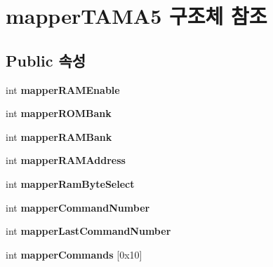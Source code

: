 \hypertarget{structmapper_t_a_m_a5}{}\section{mapper\+T\+A\+M\+A5 구조체 참조}
\label{structmapper_t_a_m_a5}
\subsection*{Public 속성}
\begin{DoxyCompactItemize}
\item 
\mbox{\label{structmapper_t_a_m_a5_aac7b2e1f7346e4db54bdb3158b1faf96}} 
int {\bfseries mapper\+R\+A\+M\+Enable}
\item 
\mbox{\label{structmapper_t_a_m_a5_a29746447b0317e41dc6b23031c02ae97}} 
int {\bfseries mapper\+R\+O\+M\+Bank}
\item 
\mbox{\label{structmapper_t_a_m_a5_a13e94f27b6428ce1c120ca95eff610ab}} 
int {\bfseries mapper\+R\+A\+M\+Bank}
\item 
\mbox{\label{structmapper_t_a_m_a5_a35ce9e6605c0506391bd92b2a8b0bb9c}} 
int {\bfseries mapper\+R\+A\+M\+Address}
\item 
\mbox{\label{structmapper_t_a_m_a5_afbb084b777ea7e13fe5ee89daef3682e}} 
int {\bfseries mapper\+Ram\+Byte\+Select}
\item 
\mbox{\label{structmapper_t_a_m_a5_a7509dcd66b893b18dc697bb083d6d6c5}} 
int {\bfseries mapper\+Command\+Number}
\item 
\mbox{\label{structmapper_t_a_m_a5_a7d91d982ac641c24b7a06122f551e8c4}} 
int {\bfseries mapper\+Last\+Command\+Number}
\item 
\mbox{\label{structmapper_t_a_m_a5_acaae7b31142e0906a0a19477007d755c}} 
int {\bfseries mapper\+Commands} \mbox{[}0x10\mbox{]}
\item 
\mbox{\label{structmapper_t_a_m_a5_a61d49b486114e79a62394c5b3100dcd1}} 

\end{DoxyCompactItemize}
